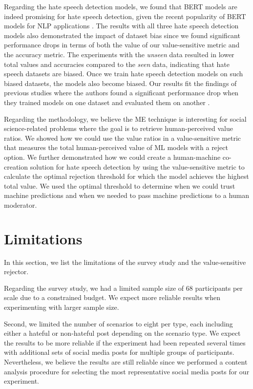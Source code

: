 %
Regarding the hate speech detection models, we found that BERT models are indeed promising for hate speech detection, given the recent popularity of BERT models for NLP applications \citep{edwards2021best,alatawi2021detecting}.
%
The results with all three hate speech detection models also demonstrated the impact of dataset bias since we found significant performance drops in terms of both the value of our value-sensitive metric and the accuracy metric.
%
The experiments with the \emph{unseen} data resulted in lower total values and accuracies compared to the \emph{seen} data, indicating that hate speech datasets are biased.
%
Once we train hate speech detection models on such biased datasets, the models also become biased.
%
Our results fit the findings of previous studies where the authors found a significant performance drop when they trained models on one dataset and evaluated them on another \citep{grondahl2018all, arango2019hate}.
%

%
Regarding the methodology, we believe the ME technique is interesting for social science-related problems where the goal is to retrieve human-perceived value ratios.
%
We showed how we could use the value ratios in a value-sensitive metric that measures the total human-perceived value of ML models with a reject option.
%
We further demonstrated how we could create a human-machine co-creation solution for hate speech detection by using the value-sensitive metric to calculate the optimal rejection threshold for which the model achieves the highest total value.
%
We used the optimal threshold to determine when we could trust machine predictions and when we needed to pass machine predictions to a human moderator.

\section{Limitations}
\label{sec:discussion-limitations}
In this section, we list the limitations of the survey study and the value-sensitive rejector.
%

%
Regarding the survey study, we had a limited sample size of 68 participants per scale due to a constrained budget.
%
We expect more reliable results when experimenting with larger sample size.
%

%
Second, we limited the number of scenarios to eight per type, each including either a hateful or non-hateful post depending on the scenario type.
%
We expect the results to be more reliable if the experiment had been repeated several times with additional sets of social media posts for multiple groups of participants.
%
Nevertheless, we believe the results are still reliable since we performed a content analysis procedure for selecting the most representative social media posts for our experiment.
%

